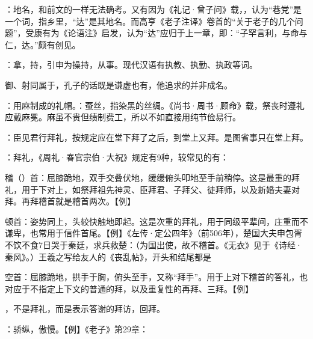 {
\begin{lyitemize}
\item {}：地名，和前文的一样无法确考。又有因为《礼记·曾子问》载，，认为“巷党”是一个词，指乡里，“达”是其地名。而高亨《老子注译》卷首的“关于老子的几个问题”，受康有为《论语注》启发，认为“达”应归于上一章，即：“子罕言利，与命与仁，达。”颇有创见。%

\item {}：拿，持，引申为操持，从事。现代汉语有执教、执勤、执政等词。
\end{lyitemize}
御、射同属于，孔子的话既是谦虚也有，他追求的并非成名。
}
{}


{
\item {}：用麻制成的礼帽。：蚕丝，指染黑的丝绸。《尚书·周书·顾命》载，祭丧时遵礼应戴麻冕。麻虽不贵但绩制费工，所以不如直接用纯节俭易行。
\item {}：臣见君行拜礼，按规定应在堂下拜了之后，到堂上又拜。是图省事只在堂上拜。%

：拜礼，《周礼·春官宗伯·大祝》规定有9种，较常见的有：
\begin{lyitemize}
\item 稽（）首：屈膝跪地，双手交叠伏地，缓缓俯头叩地至手前稍停。这是最重的拜礼，用于下对上，如祭拜祖先神灵、臣拜君、子拜父、徒拜师，以及新婚夫妻对拜。再拜稽首就是稽首两次。【例】
\item 顿首：姿势同上，头较快触地即起。这是次重的拜礼，用于同级平辈间，庄重而不谦卑，也常用于信件首尾。【例】《左传·定公四年》（前506年），楚国大夫申包胥不饮不食7日哭于秦廷，求兵救楚：（为国出使，故不稽首。《无衣》见于《诗经·秦风》。）王羲之写给友人的《丧乱帖》，开头和结尾都是  %
\item {}空首：屈膝跪地，拱手于胸，俯头至手，又称“拜手”。用于上对下稽首的答礼，也对应于不指定上下文的普通的拜，以及重复性的再拜、三拜。【例】  
\end{lyitemize}
 ，不是拜礼，而是表示答谢的拜访，回拜。
\item {}：骄纵，傲慢。【例】《老子》第29章：
}
{}



